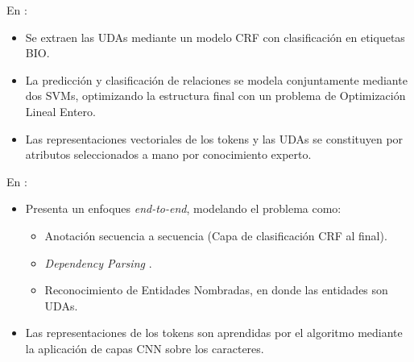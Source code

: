 \documentclass[a4paper,11pt,twocolumn,twoside]{article}
\begin{document}
En \cite{stab2017parsing}:

\begin{itemize}
	\item Se extraen las UDAs mediante un modelo CRF con clasificación en etiquetas BIO.
	\item La predicción y clasificación de relaciones se modela conjuntamente mediante dos SVMs,
	optimizando la estructura final con un problema de Optimización Lineal Entero.
	\item Las representaciones vectoriales de los tokens y las UDAs se constituyen por atributos 
	seleccionados a mano por conocimiento experto.
\end{itemize}


En \cite{eger2017neural}:

\begin{itemize}
	\item Presenta un enfoques \textit{end-to-end}, modelando el problema como:
	\begin{itemize}
		\item Anotación secuencia a secuencia (Capa de clasificación CRF al final).
		\item \textit{Dependency Parsing} \cite{kiperwasser2016simple}.
		\item Reconocimiento de Entidades Nombradas, en donde las entidades son UDAs.
	\end{itemize}
	\item Las representaciones de los tokens son aprendidas por el algoritmo mediante la 
	aplicación de capas CNN sobre los caracteres.
\end{itemize}
\end{document}
